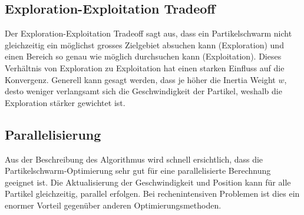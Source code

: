 \subsection{Exploration-Exploitation Tradeoff}
Der Exploration-Exploitation Tradeoff sagt aus, dass ein Partikelschwarm nicht gleichzeitig ein möglichst grosses Zielgebiet absuchen kann (Exploration) und einen Bereich so genau wie möglich durchsuchen kann (Exploitation). Dieses Verhältnis von Exploration zu Exploitation hat einen starken Einfluss auf die Konvergenz. Generell kann gesagt werden, dass je höher die Inertia Weight $w$, desto weniger verlangsamt sich die Geschwindigkeit der Partikel, weshalb die Exploration stärker gewichtet ist.

\subsection{Parallelisierung}
Aus der Beschreibung des Algorithmus wird schnell ersichtlich, dass die Partikelschwarm-Optimierung sehr gut für eine parallelisierte Berechnung geeignet ist. Die Aktualisierung der Geschwindigkeit und Position kann für alle Partikel gleichzeitig, parallel erfolgen. Bei rechenintensiven Problemen ist dies ein enormer Vorteil gegenüber anderen Optimierungsmethoden.